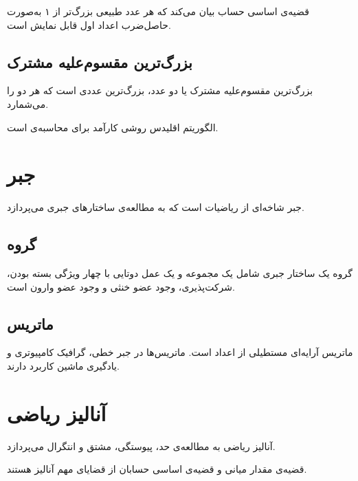 \documentclass{matinbook}
\begin{document}
قضیه‌ی اساسی حساب بیان
می‌کند که هر عدد طبیعی بزرگ‌تر از ۱ به‌صورت
حاصل‌ضرب اعداد اول قابل
نمایش است.

\subsection{بزرگ‌ترین مقسوم‌علیه مشترک}
\label{sec:math-gcd}

بزرگ‌ترین مقسوم‌علیه مشترک یا 
دو عدد، بزرگ‌ترین عددی است که هر دو را می‌شمارد.

الگوریتم اقلیدس روشی کارآمد
برای محاسبه‌ی  است.

\section{جبر}
\label{sec:math-algebra}

جبر شاخه‌ای از ریاضیات است که به مطالعه‌ی
ساختارهای جبری می‌پردازد.

\subsection{گروه}
\label{sec:math-group}

گروه یک ساختار جبری شامل یک مجموعه و یک
عمل دوتایی با چهار ویژگی بسته
بودن، شرکت‌پذیری،
وجود عضو خنثی و وجود عضو
وارون است.

\subsection{ماتریس}
\label{sec:math-matrix}

ماتریس آرایه‌ای مستطیلی از اعداد است.
ماتریس‌ها در جبر خطی،
گرافیک کامپیوتری و یادگیری
ماشین کاربرد دارند.

\section{آنالیز ریاضی}
\label{sec:math-analysis}

آنالیز ریاضی به مطالعه‌ی
حد، پیوستگی،
مشتق و انتگرال می‌پردازد.

قضیه‌ی مقدار میانی و
قضیه‌ی اساسی حسابان از
قضایای مهم آنالیز هستند.
\end{document}
